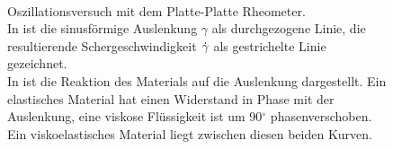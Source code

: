 \begin{figure}[tb]
    \centering
    \\
    \caption{Oszillationsversuch mit dem Platte-Platte Rheometer.\\
    In  ist die sinusförmige Auslenkung $\gamma$ als durchgezogene Linie, die resultierende Schergeschwindigkeit $\dot\gamma$ als gestrichelte Linie gezeichnet.\\
    In  ist die Reaktion des Materials auf die Auslenkung dargestellt. Ein elastisches Material hat einen Widerstand in Phase mit der Auslenkung, eine viskose Flüssigkeit ist um 90$^\circ$ phasenverschoben. Ein viskoelastisches Material liegt zwischen diesen beiden Kurven.
    }
    \label{fig:schwingungsmodi}
\end{figure}
%
